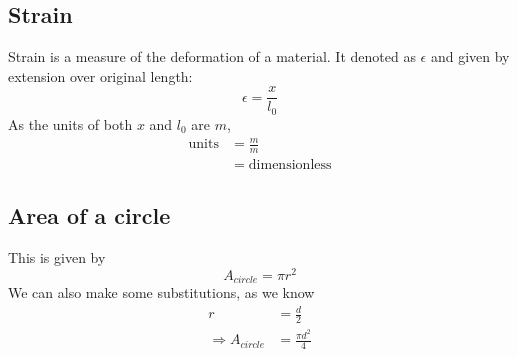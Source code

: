 \documentclass{article}
\begin{document}
        \subsection{Strain}
            Strain is a measure of the deformation of a material. It denoted as
            $\epsilon$ and given by extension over original length:
            \begin{equation}
                \epsilon = \frac{x}{l_0}
            \end{equation}
            As the units of both $x$ and $l_0$ are $m$,
            \begin{align*}
                \mathrm{units} &= \frac{m}{m}\\
                               &= \mathrm{dimensionless}
            \end{align*}
        \subsection{Area of a circle}
            This is given by
            \begin{equation}
                A_{circle} = \pi r^2
            \end{equation}
            We can also make some substitutions, as we know
            \begin{align*}
                r &= \frac{d}{2}\\
                \Rightarrow A_{circle} &= \frac{\pi d^2}{4}
            \end{align*}
\end{document}
